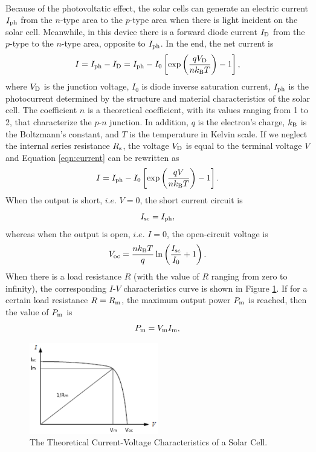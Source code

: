 \documentclass[a4paper]{article}
\begin{document}
    \paragraph{} Because of the photovoltatic effect, the solar cells can generate an electric current $I_{\rm ph}$ from the $n$-type area to the $p$-type area when there is light incident on the solar cell. Meanwhile, in this device there is a forward diode current $I_{\rm D}$ from the $p$-type to the $n$-type area, opposite to $I_{\rm ph}$. In the end, the net current is 
    \begin{equation}
        I=I_{\rm ph}-I_{\rm D}=I_{\rm ph}-I_0\left[\exp\left(\frac{qV_{\rm D}}{nk_{\rm B}T}\right)-1\right],
        \label{eqn:current}
    \end{equation}
    where $V_{\rm D}$ is the junction voltage, $I_0$ is diode inverse saturation current, $I_{\rm ph}$ is the photocurrent determined by the structure and material characteristics of the solar cell. The coefficient $n$ is a theoretical coefficient, with its values ranging from 1 to 2, that characterize the $p$-$n$ junction. In addition, $q$ is the electron's charge, $k_{\rm B}$ is the Boltzmann's constant, and $T$ is the temperature in Kelvin scale. If we neglect the internal series resistance $R_{\rm s}$, the voltage $V_{\rm D}$ is equal to the terminal voltage $V$ and Equation \ref{eqn:current} can be rewritten as $$I=I_{\rm ph}-I_0\left[\exp\left(\frac{qV}{nk_{\rm B}T}\right)-1\right].$$ When the output is short, $i.e.$ $V=0$, the short current circuit is $$I_{\rm sc}=I_{\rm ph},$$ whereas when the output is open, $i.e.$ $I=0$, the open-circuit voltage is $$V_{\rm oc}=\frac{nk_{\rm B}T}{q}\ln\left(\frac{I_{\rm sc}}{I_0}+1\right).$$ When there is a load resistance $R$ (with the value of $R$ ranging from zero to infinity), the corresponding $I$-$V$ characteristics curve is shown in Figure \ref{fig:theory}. If for a certain load resistance $R=R_{\rm m}$, the maximum output power $P_{\rm m}$ is reached, then the value of $P_{\rm m}$ is $$P_{\rm m}=V_{\rm m}I_{\rm m},$$
    \begin{figure}[!ht]
        \centering
        \includegraphics[width=0.5\textwidth]{fig/IVtheory.png}
        \caption{The Theoretical Current-Voltage Characteristics of a Solar Cell.}
        \label{fig:theory}
    \end{figure}
\end{document}

